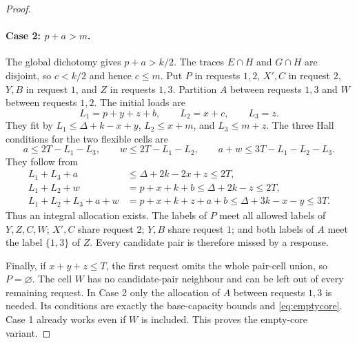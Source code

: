 \begin{proof}
\paragraph{Case 2: $p+a>m$.}
The global dichotomy gives $p+a>k/2$. The traces $E\cap H$ and
$G\cap H$ are disjoint, so $c<k/2$ and hence $c\le m$.
Put $P$ in requests $1,2$, $X',C$ in request $2$, $Y,B$ in request
$1$, and $Z$ in requests $1,3$. Partition $A$ between requests $1,3$
and $W$ between requests $1,2$. The initial loads are
\[
 L_1=p+y+z+b,\qquad L_2=x+c,\qquad L_3=z.
\]
They fit by $L_1\le\Delta+k-x+y$, $L_2\le x+m$, and $L_3\le m+z$.
The three Hall conditions for the two flexible cells are
\[
 a\le2T-L_1-L_3,\qquad w\le2T-L_1-L_2,\qquad
 a+w\le3T-L_1-L_2-L_3.
\]
They follow from
\begin{align*}
 L_1+L_3+a&\le\Delta+2k-2x+z\le2T,\\
 L_1+L_2+w&=p+x+k+b\le\Delta+2k-z\le2T,\\
 L_1+L_2+L_3+a+w&=p+x+k+z+a+b
                  \le\Delta+3k-x-y\le3T.
\end{align*}
Thus an integral allocation exists. The labels of $P$ meet all allowed
labels of $Y,Z,C,W$; $X',C$ share request $2$; $Y,B$ share request $1$;
and both labels of $A$ meet the label $\{1,3\}$ of $Z$. Every candidate
pair is therefore missed by a response.

Finally, if $x+y+z\le T$, the first request omits the whole pair-cell
union, so $P=\varnothing$. The cell $W$ has no candidate-pair neighbour
and can be left out of every remaining request. In Case 2 only the
allocation of $A$ between requests $1,3$ is needed. Its conditions are
exactly the base-capacity bounds and \eqref{eq:emptycore}. Case 1 already
works even if $W$ is included. This proves the empty-core variant.
\end{proof}
